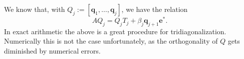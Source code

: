 \documentclass{article}
\begin{document}
	We know that, with $Q_{j}:=[\mathbf{q}_1,\ldots,\mathbf{q}_j]$, we have the relation
	\begin{equation}\label{eq:matLanczos}
		AQ_{j}=Q_jT_j+\beta_{j}\mathbf{q}_{j+1}\mathbf{e}^{\ast}.
	\end{equation}
	In exact arithmetic the above is a great procedure for tridiagonalization. Numerically this is
	not the case unfortunately, as the orthogonality of $Q$ gets diminished by numerical errors.
	
\FloatBarrier
\newpage
\printbibliography
\end{document}

